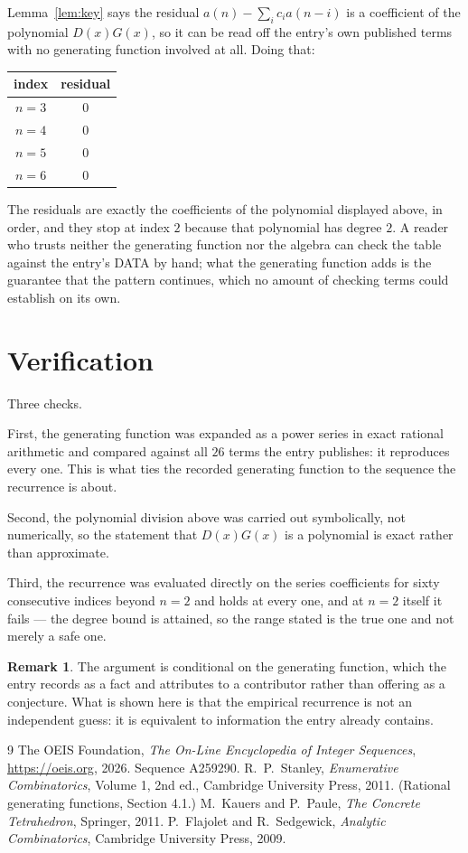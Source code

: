 \documentclass[11pt,a4paper]{article}
\theoremstyle{plain}
\theoremstyle{definition}
\newtheorem{remark}[theorem]{Remark}
\begin{document}
Lemma~\ref{lem:key} says the residual $a(n)-\sum_ic_ia(n-i)$ is a coefficient of the
polynomial $D(x)G(x)$, so it can be read off the entry's own published terms with no
generating function involved at all. Doing that:
\begin{center}
\begin{tabular}{cc}
index & residual \\ \hline
$n=3$ & $0$ \\
$n=4$ & $0$ \\
$n=5$ & $0$ \\
$n=6$ & $0$
\end{tabular}
\end{center}
The residuals are exactly the coefficients of the polynomial displayed above, in order, and
they stop at index $2$ because that polynomial has degree $2$. A reader who trusts
neither the generating function nor the algebra can check the table against the entry's DATA
by hand; what the generating function adds is the guarantee that the pattern continues, which
no amount of checking terms could establish on its own.

\section{Verification}

Three checks.

First, the generating function was expanded as a power series in exact rational arithmetic and
compared against all $26$ terms the entry publishes: it reproduces every one. This is
what ties the recorded generating function to the sequence the recurrence is about.

Second, the polynomial division above was carried out symbolically, not numerically, so the
statement that $D(x)G(x)$ is a polynomial is exact rather than approximate.

Third, the recurrence was evaluated directly on the series coefficients for sixty consecutive
indices beyond $n=2$ and holds at every one, and at $n=2$ itself it fails --- the
degree bound is attained, so the range stated is the true one and not merely a safe one.

\begin{remark}
The argument is conditional on the generating function, which the entry records as a fact and
attributes to a contributor rather than offering as a conjecture. What is shown here is that
the empirical recurrence is not an independent guess: it is equivalent to information the
entry already contains.
\end{remark}

\begin{thebibliography}{9}
 The OEIS Foundation, \emph{The On-Line Encyclopedia of Integer
Sequences}, \url{https://oeis.org}, 2026. Sequence A259290.
 R.~P.~Stanley, \emph{Enumerative Combinatorics}, Volume 1, 2nd ed.,
Cambridge University Press, 2011. (Rational generating functions, Section 4.1.)
 M.~Kauers and P.~Paule, \emph{The Concrete Tetrahedron}, Springer, 2011.
 P.~Flajolet and R.~Sedgewick, \emph{Analytic Combinatorics}, Cambridge
University Press, 2009.
\end{thebibliography}
\end{document}
